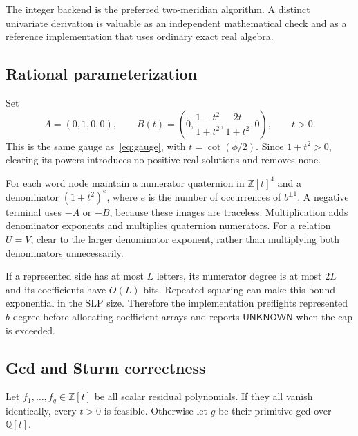 \documentclass[11pt]{article}
\theoremstyle{definition}
\theoremstyle{remark}
\newcommand{\ZZ}{\mathbb Z}
\newcommand{\QQ}{\mathbb Q}
\newcommand{\UN}{\mathsf{UNKNOWN}}
\begin{document}
The integer backend is the preferred two-meridian algorithm. A distinct univariate derivation is valuable as an independent mathematical check and as a reference implementation that uses ordinary exact real algebra.

\subsection{Rational parameterization}
Set
\begin{equation}
A=(0,1,0,0),\qquad
B(t)=\left(0,\frac{1-t^2}{1+t^2},\frac{2t}{1+t^2},0\right),\qquad t>0.
\label{eq:rational}
\end{equation}
This is the same gauge as~\eqref{eq:gauge}, with $t=\cot(\phi/2)$. Since $1+t^2>0$, clearing its powers introduces no positive real solutions and removes none.

For each word node maintain a numerator quaternion in $\ZZ[t]^4$ and a denominator $(1+t^2)^e$, where $e$ is the number of occurrences of $b^{\pm1}$. A negative terminal uses $-A$ or $-B$, because these images are traceless. Multiplication adds denominator exponents and multiplies quaternion numerators. For a relation $U=V$, clear to the larger denominator exponent, rather than multiplying both denominators unnecessarily.

If a represented side has at most $L$ letters, its numerator degree is at most $2L$ and its coefficients have $O(L)$ bits. Repeated squaring can make this bound exponential in the SLP size. Therefore the implementation preflights represented $b$-degree before allocating coefficient arrays and reports $\UN$ when the cap is exceeded.

\subsection{Gcd and Sturm correctness}
Let $f_1,\ldots,f_q\in\ZZ[t]$ be all scalar residual polynomials. If they all vanish identically, every $t>0$ is feasible. Otherwise let $g$ be their primitive gcd over $\QQ[t]$.
\end{document}
